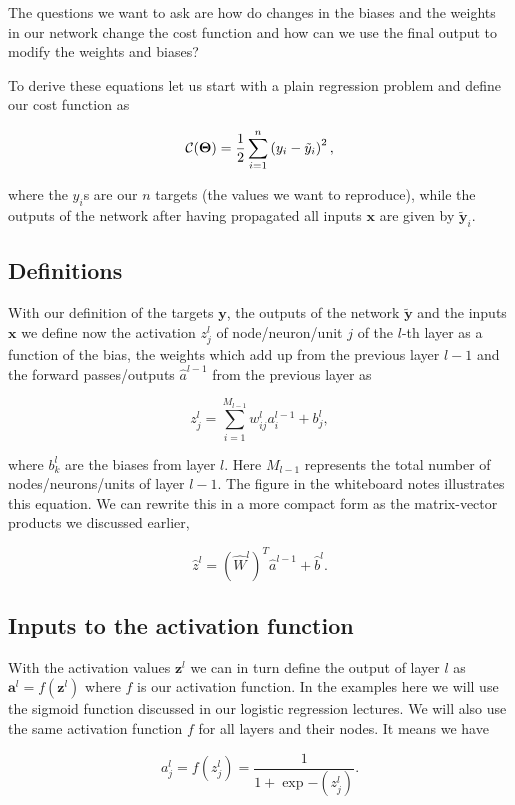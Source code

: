 \documentclass[%
oneside,                 %
final,                   %
10pt]{article}
\begin{document}
The questions we want to ask are how do changes in the biases and the
weights in our network change the cost function and how can we use the
final output to modify the weights and biases?

To derive these equations let us start with a plain regression problem
and define our cost function as

\[
{\cal C}(\bm{\Theta})  =  \frac{1}{2}\sum_{i=1}^n\left(y_i - \tilde{y}_i\right)^2, 
\]

where the $y_i$s are our $n$ targets (the values we want to
reproduce), while the outputs of the network after having propagated
all inputs $\bm{x}$ are given by $\bm{\tilde{y}}_i$.

\subsection{Definitions}

With our definition of the targets $\bm{y}$, the outputs of the
network $\bm{\tilde{y}}$ and the inputs $\bm{x}$ we
define now the activation $z_j^l$ of node/neuron/unit $j$ of the
$l$-th layer as a function of the bias, the weights which add up from
the previous layer $l-1$ and the forward passes/outputs
$\hat{a}^{l-1}$ from the previous layer as

\[
z_j^l = \sum_{i=1}^{M_{l-1}}w_{ij}^la_i^{l-1}+b_j^l,
\]

where $b_k^l$ are the biases from layer $l$.  Here $M_{l-1}$
represents the total number of nodes/neurons/units of layer $l-1$. The
figure in the whiteboard notes illustrates this equation.  We can rewrite this in a more
compact form as the matrix-vector products we discussed earlier,

\[
\hat{z}^l = \left(\hat{W}^l\right)^T\hat{a}^{l-1}+\hat{b}^l.
\]

\subsection{Inputs to the activation function}

With the activation values $\bm{z}^l$ we can in turn define the
output of layer $l$ as $\bm{a}^l = f(\bm{z}^l)$ where $f$ is our
activation function. In the examples here we will use the sigmoid
function discussed in our logistic regression lectures. We will also use the same activation function $f$ for all layers
and their nodes.  It means we have

\[
a_j^l = f(z_j^l) = \frac{1}{1+\exp{-(z_j^l)}}.
\]
\end{document}
